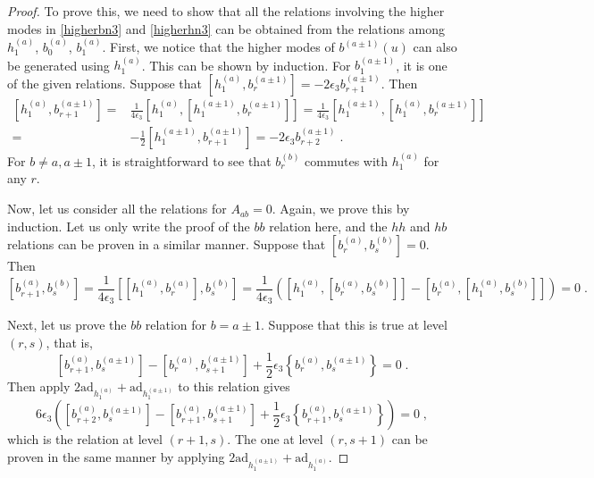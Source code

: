 \documentclass[11pt]{article}
\numberwithin{equation}{section}
\numberwithin{figure}{section}
\numberwithin{table}{section}
\begin{document}
\begin{proof}
	To prove this, we need to show that all the relations involving the higher modes in \eqref{higherbn3} and \eqref{higherhn3} can be obtained from the relations among $h^{(a)}_1$, $b^{(a)}_0$, $b^{(a)}_1$. First, we notice that the higher modes of $b^{(a\pm1)}(u)$ can also be generated using $h^{(a)}_1$. This can be shown by induction. For $b^{(a\pm1)}_1$, it is one of the given relations. Suppose that $\left[h^{(a)}_1,b^{(a\pm1)}_r\right]=-2\epsilon_3b^{(a\pm1)}_{r+1}$. Then
\begin{align}
	\left[h^{(a)}_1,b^{(a\pm1)}_{r+1}\right]=&\frac{1}{4\epsilon_3}\left[h^{(a)}_1,\left[h^{(a\pm1)}_1,b^{(a\pm1)}_r\right]\right]=\frac{1}{4\epsilon_3}\left[h^{(a\pm1)}_1,\left[h^{(a)}_1,b^{(a\pm1)}_r\right]\right]\nonumber\\
	=&-\frac{1}{2}\left[h^{(a\pm1)}_1,b^{(a\pm1)}_{r+1}\right]=-2\epsilon_3b^{(a\pm1)}_{r+2}\;.\label{ha1ba+-1}
\end{align}
For $b\neq a,a\pm1$, it is straightforward to see that $b^{(b)}_r$ commutes with $h^{(a)}_1$ for any $r$.

Now, let us consider all the relations for $A_{ab}=0$. Again, we prove this by induction. Let us only write the proof of the $bb$ relation here, and the $hh$ and $hb$ relations can be proven in a similar manner. Suppose that $\left[b^{(a)}_r,b^{(b)}_s\right]=0$. Then
\begin{equation}
	\left[b^{(a)}_{r+1},b^{(b)}_s\right]=\frac{1}{4\epsilon_3}\left[\left[h^{(a)}_1,b^{(a)}_r\right],b^{(b)}_s\right]=\frac{1}{4\epsilon_3}\left(\left[h^{(a)}_1,\left[b^{(a)}_r,b^{(b)}_s\right]\right]-\left[b^{(a)}_r,\left[h^{(a)}_1,b^{(b)}_s\right]\right]\right)=0\;.
\end{equation}

Next, let us prove the $bb$ relation for $b=a\pm1$. Suppose that this is true at level $(r,s)$, that is,
\begin{equation}
	\left[b^{(a)}_{r+1},b^{(a\pm1)}_s\right]-\left[b^{(a)}_r,b^{(a\pm1)}_{s+1}\right]+\frac{1}{2}\epsilon_3\left\{b^{(a)}_r,b^{(a\pm1)}_s\right\}=0\;.
\end{equation}
Then apply $2\mathrm{ad}_{h^{(a)}_1}+\mathrm{ad}_{h^{(a\pm1)}_1}$ to this relation gives
\begin{equation}
	6\epsilon_3\left(\left[b^{(a)}_{r+2},b^{(a\pm1)}_s\right]-\left[b^{(a)}_{r+1},b^{(a\pm1)}_{s+1}\right]+\frac{1}{2}\epsilon_3\left\{b^{(a)}_{r+1},b^{(a\pm1)}_s\right\}\right)=0\;,
\end{equation}
which is the relation at level $(r+1,s)$. The one at level $(r,s+1)$ can be proven in the same manner by applying $2\mathrm{ad}_{h^{(a\pm1)}_1}+\mathrm{ad}_{h^{(a)}_1}$.


\end{proof}
\end{document}
